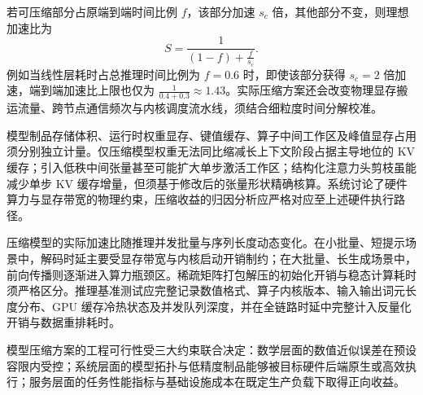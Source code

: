 \documentclass[../textbook.tex]{subfiles}
\begin{document}
若可压缩部分占原端到端时间比例 $f$，该部分加速 $s_c$ 倍，其他部分不变，则理想加速比为
\begin{equation}
 S=\frac1{(1-f)+\frac{f}{s_c}}.
\end{equation}
例如当线性层耗时占总推理时间比例为 $f=0.6$ 时，即使该部分获得 $s_c=2$ 倍加速，端到端加速比上限也仅为 $\frac{1}{0.4+0.3}\approx 1.43$。实际压缩方案还会改变物理显存搬运流量、跨节点通信频次与内核调度流水线，须结合细粒度时间分解校准。

模型制品存储体积、运行时权重显存、键值缓存、算子中间工作区及峰值显存占用须分别独立计量。仅压缩模型权重无法同比缩减长上下文阶段占据主导地位的 KV 缓存；引入低秩中间张量甚至可能扩大单步激活工作区；结构化注意力头剪枝虽能减少单步 KV 缓存增量，但须基于修改后的张量形状精确核算。系统讨论了硬件算力与显存带宽的物理约束，压缩收益的归因分析应严格对应至上述硬件执行路径。

压缩模型的实际加速比随推理并发批量与序列长度动态变化。在小批量、短提示场景中，解码时延主要受显存带宽与内核启动开销制约；在大批量、长生成场景中，前向传播则逐渐进入算力瓶颈区。稀疏矩阵打包解压的初始化开销与稳态计算耗时须严格区分。推理基准测试应完整记录数值格式、算子内核版本、输入输出词元长度分布、GPU 缓存冷热状态及并发队列深度，并在全链路时延中完整计入反量化开销与数据重排耗时。

\begin{note}[模型压缩的三元可行性边界]
模型压缩方案的工程可行性受三大约束联合决定：数学层面的数值近似误差在预设容限内受控；系统层面的模型拓扑与低精度制品能够被目标硬件后端原生或高效执行；服务层面的任务性能指标与基础设施成本在既定生产负载下取得正向收益。
\end{note}





\begingroup
\sloppy

\chapterreferences
\endgroup
\myendchapterdocument
\end{document}
